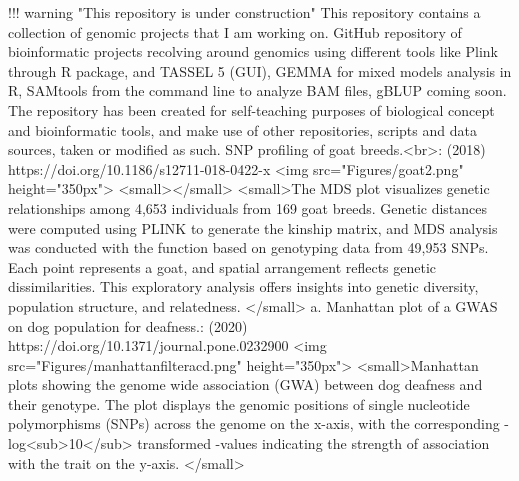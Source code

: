 \markdownRendererDocumentBegin
\markdownRendererSectionBegin
{}\markdownRendererInterblockSeparator
{}!!! warning "This repository is under construction"\markdownRendererInterblockSeparator
{}This repository contains a collection of genomic projects that I am working on. GitHub repository of bioinformatic projects recolving around genomics using different tools like Plink through  R package,  and TASSEL 5 (GUI), GEMMA for mixed models analysis in R, SAMtools from the command line to analyze BAM files, gBLUP coming soon.\markdownRendererInterblockSeparator
{}The repository has been created for self-teaching purposes of biological concept and bioinformatic tools, and make use of other repositories, scripts and data sources, taken or modified as such.\markdownRendererInterblockSeparator
{}\markdownRendererOlBeginTight
{}SNP profiling of goat breeds.<br>:  (2018) https://doi.org/10.1186/s12711-018-0422-x\markdownRendererOlItemEnd 
\markdownRendererOlEndTight \markdownRendererInterblockSeparator
{}<img src="Figures/goat2.png" height="350px">\markdownRendererInterblockSeparator
{}<small></small>\markdownRendererInterblockSeparator
{}<small>The MDS plot visualizes genetic relationships among 4,653 individuals from 169 goat breeds. Genetic distances were computed using PLINK to generate the kinship matrix, and MDS analysis was conducted with the  function based on genotyping data from 49,953 SNPs. Each point represents a goat, and spatial arrangement reflects genetic dissimilarities. This exploratory analysis offers insights into genetic diversity, population structure, and relatedness. </small>\markdownRendererInterblockSeparator
{}\markdownRendererOlBeginTight
{}a. Manhattan plot of a GWAS on dog population for deafness.:  (2020) https://doi.org/10.1371/journal.pone.0232900\markdownRendererOlItemEnd 
\markdownRendererOlEndTight \markdownRendererInterblockSeparator
{}<img src="Figures/manhattanfilter\markdownRendererUnderscore{}acd.png" height="350px"> <small>Manhattan plots showing the genome wide association (GWA) between dog deafness and their genotype. The plot displays the genomic positions of single nucleotide polymorphisms (SNPs) across the genome on the x-axis, with the corresponding -log<sub>10</sub> transformed -values indicating the strength of association with the trait on the y-axis. </small>\markdownRendererInterblockSeparator
